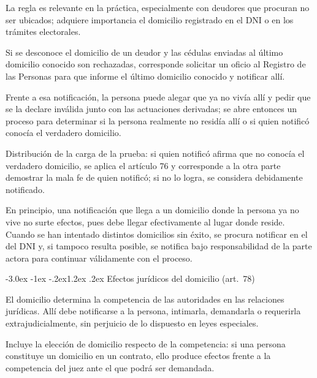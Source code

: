 \documentclass[12pt,oneside]{book}
\makeatletter
\renewcommand\section{\@startsection{section}{1}{\z@}%
  {-3.0ex \@plus -1ex \@minus -.2ex}{1.2ex \@plus .2ex}%
  {\normalfont\large\bfseries\color{acento}}}
\makeatother
\begin{document}
La regla es relevante en la práctica, especialmente con deudores que procuran no ser ubicados; adquiere importancia el domicilio registrado en el DNI o en los trámites electorales.

\begin{ejemplo}
Si se desconoce el domicilio de un deudor y las cédulas enviadas al último domicilio conocido son rechazadas, corresponde solicitar un oficio al Registro de las Personas para que informe el último domicilio conocido y notificar allí.
\end{ejemplo}

Frente a esa notificación, la persona puede alegar que ya no vivía allí y pedir que se la declare inválida junto con las actuaciones derivadas; se abre entonces un proceso para determinar si la persona realmente no residía allí o si quien notificó conocía el verdadero domicilio.

\begin{importante}
Distribución de la carga de la prueba: si quien notificó afirma que no conocía el verdadero domicilio, se aplica el artículo 76 y corresponde a la otra parte demostrar la mala fe de quien notificó; si no lo logra, se considera debidamente notificado.
\end{importante}

En principio, una notificación que llega a un domicilio donde la persona ya no vive no surte efectos, pues debe llegar efectivamente al lugar donde reside. Cuando se han intentado distintos domicilios sin éxito, se procura notificar en el del DNI y, si tampoco resulta posible, se notifica bajo responsabilidad de la parte actora para continuar válidamente con el proceso.

\section{Efectos jurídicos del domicilio (art.~78)}

\begin{regla}
El domicilio determina la competencia de las autoridades en las relaciones jurídicas. Allí debe notificarse a la persona, intimarla, demandarla o requerirla extrajudicialmente, sin perjuicio de lo dispuesto en leyes especiales.
\end{regla}

Incluye la elección de domicilio respecto de la competencia: si una persona constituye un domicilio en un contrato, ello produce efectos frente a la competencia del juez ante el que podrá ser demandada.
\end{document}
